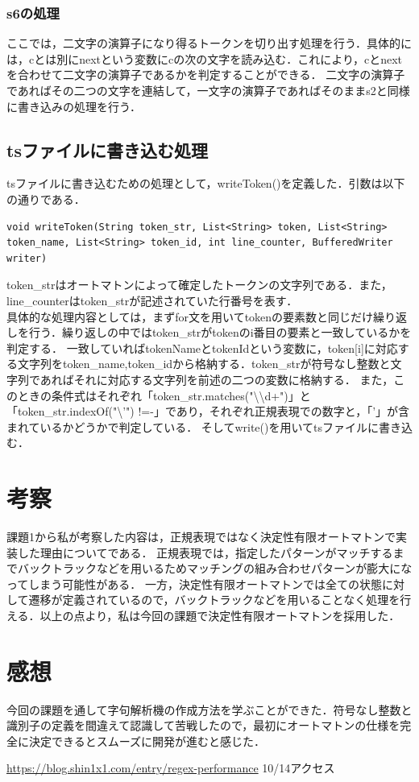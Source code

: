 \documentclass[dvipdfmx]{jarticle}
\begin{document}
\subsubsection{s6の処理}
ここでは，二文字の演算子になり得るトークンを切り出す処理を行う．具体的には，cとは別にnextという変数にcの次の文字を読み込む．これにより，cとnextを合わせて二文字の演算子であるかを判定することができる．
二文字の演算子であればその二つの文字を連結して，一文字の演算子であればそのままs2と同様に書き込みの処理を行う．
\subsection{tsファイルに書き込む処理}
tsファイルに書き込むための処理として，writeToken()を定義した．引数は以下の通りである．
\begin{lstlisting}
void writeToken(String token_str, List<String> token, List<String> token_name, List<String> token_id, int line_counter, BufferedWriter writer)
\end{lstlisting}
token\_strはオートマトンによって確定したトークンの文字列である．また，line\_counterはtoken\_strが記述されていた行番号を表す．
\\具体的な処理内容としては，まずfor文を用いてtokenの要素数と同じだけ繰り返しを行う．繰り返しの中ではtoken\_strがtokenのi番目の要素と一致しているかを判定する．
一致していればtokenNameとtokenIdという変数に，token[i]に対応する文字列をtoken\_name,token\_idから格納する．token\_strが符号なし整数と文字列であればそれに対応する文字列を前述の二つの変数に格納する．
また，このときの条件式はそれぞれ「token\_str.matches("\textbackslash\textbackslash d+")」と「token\_str.indexOf("\textbackslash'") !=-」であり，それぞれ正規表現での数字と，「’」が含まれているかどうかで判定している．
そしてwrite()を用いてtsファイルに書き込む．
\section{考察}
課題1から私が考察した内容は，正規表現ではなく決定性有限オートマトンで実装した理由についてである．
正規表現では，指定したパターンがマッチするまでバックトラックなどを用いるためマッチングの組み合わせパターンが膨大になってしまう可能性がある．\cite{1}
一方，決定性有限オートマトンでは全ての状態に対して遷移が定義されているので，バックトラックなどを用いることなく処理を行える．以上の点より，私は今回の課題で決定性有限オートマトンを採用した．
\section{感想}
今回の課題を通して字句解析機の作成方法を学ぶことができた．符号なし整数と識別子の定義を間違えて認識して苦戦したので，最初にオートマトンの仕様を完全に決定できるとスムーズに開発が進むと感じた．
\begin{thebibliography}{1}
     \url{https://blog.shin1x1.com/entry/regex-performance} 10/14アクセス
\end{thebibliography}
\end{document}
